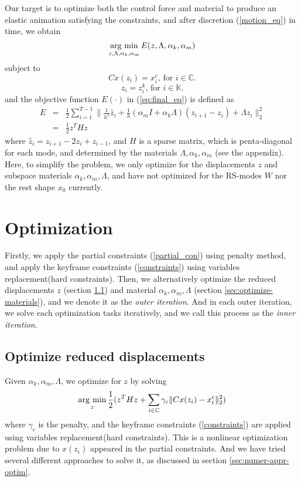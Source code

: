 \documentclass[9pt,twocolumn]{extarticle}
\newcommand{\argmin}{\operatornamewithlimits{arg\ min}}
\begin{document}
Our target is to optimize both the control force and material to produce an
elastic animation satisfying the constraints, and after discretion
(\ref{motion_eq}) in time, we obtain
\begin{equation}
  \argmin_{z,\Lambda,\alpha_k,\alpha_m}E(z,\Lambda,\alpha_k,\alpha_m)\label{eq:final_eq}
\end{equation}
subject to 
\begin{equation} \label{partial_con}
  Cx(z_i) = {x}_i^c\mbox{, for } i\in \mathbb{C}.
\end{equation}
\begin{equation} \label{constraints}
  z_i = z_i^k \mbox{, for } i\in \mathbb{K}.
\end{equation}
and the objective function $E(\cdot)$ in (\ref{eq:final_eq}) is defined as
\begin{eqnarray}
  E &=& \frac{1}{2}\sum_{i=1}^{T-1}\|\frac{1}{h^2}\hat{z}_i+
  \frac{1}{h}(\alpha_mI+\alpha_k\Lambda)(z_{i+1}-z_{i})+\Lambda
  z_i\|_{2}^2 \nonumber \\
  &=& \frac{1}{2}z^THz  \label{objE}
\end{eqnarray}
where $\hat{z}_i=z_{i+1}-2z_{i}+z_{i-1}$, and $H$ is a sparse matrix, which is
penta-diagonal for each mode, and determined by the materials
$\Lambda,\alpha_k,\alpha_m$ (see the appendix). Here, to simplify the problem,
we only optimize for the displacements $z$ and subspace materials
$\alpha_k,\alpha_m,\Lambda$, and have not optimized for the RS-modes $W$ nor the
rest shape $x_0$ currently.

\section{Optimization}\label{sec:optimization}
Firstly, we apply the partial constraints (\ref{partial_con}) using penalty
method, and apply the keyframe constraints (\ref{constraints}) using variables
replacement(hard constraints). Then, we alternatively optimize the reduced
displacements $z$ (section \ref{sec:optim-reduc-displ}) and material
$\alpha_k,\alpha_m,\Lambda$ (section \ref{sec:optimize-materials}), and we
denote it as the \emph{outer iteration}. And in each outer iteration, we solve
each optimization tasks iteratively, and we call this process as the \emph{inner
  iteration}.

\subsection{Optimize reduced displacements}\label{sec:optim-reduc-displ}
Given $\alpha_k,\alpha_m,\Lambda$, we optimize for $z$ by solving
\begin{equation} \label{optz}
  \argmin_{z}\frac{1}{2}( z^THz+\sum_{i\in \mathbb{C}}\gamma_c\|Cx(z_i)-{x}_i^c\|_{2}^2)
\end{equation}
where $\gamma_c$ is the penalty, and the keyframe constraints (\ref{constraints})
are applied using variables replacement(hard constraints). This is a nonlinear
optimization problem due to $x(z_i)$ appeared in the partial constraints. And we
have tried several different approaches to solve it, as discussed in section
\ref{sec:numer-appr-optim}.
\end{document}
